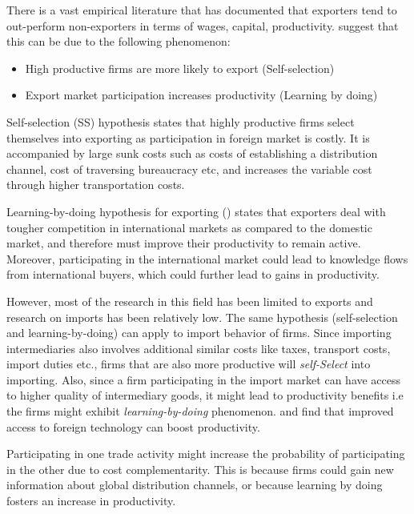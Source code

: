 \documentclass[12pt]{article}
\begin{document}
There is a vast empirical literature  that has documented that exporters tend to
out-perform non-exporters  in terms of wages, capital,
productivity.%
\textcite{bernard1999exceptional}  suggest that this can be due
to the following phenomenon:
\begin{itemize}
\item High productive firms are more likely to export (Self-selection)
\item Export market participation increases productivity (Learning by doing)
\end{itemize}

Self-selection (SS) hypothesis states that highly productive firms
select themselves into exporting as  
participation in foreign market is costly. It is accompanied by large
sunk costs
such as costs of establishing a distribution channel,
cost of traversing bureaucracy etc, and increases the variable cost
through higher transportation costs. %

Learning-by-doing hypothesis for exporting (\textcite{haidar2012trade}) states that exporters deal with
tougher competition in international markets as compared to the
domestic market, and therefore must improve their productivity to
remain active. Moreover, participating in the
international market could lead to knowledge flows from international
buyers, which could further lead to gains in productivity.

However, most of the research in this field has been limited to
exports and research on imports has been relatively low. The same hypothesis (self-selection and learning-by-doing) can  apply
to import behavior of firms. Since importing intermediaries also
involves additional
similar costs like  taxes, transport costs, import duties
etc., firms that are also more productive will \textit{self-Select}
into importing. Also, since a firm
participating in the import market can have access to higher quality
of intermediary goods, it might lead to productivity benefits
i.e the firms might exhibit \textit{learning-by-doing} phenomenon. 
\textcite{topalova2011trade}  and \textcite{halpern2011imported}
find that improved access to foreign technology can boost
productivity. 

Participating in one trade activity might increase the probability of
participating in the other due to cost complementarity. This is
because firms could gain new information about global distribution
channels, or because learning by doing fosters an increase in productivity.   %
\end{document}
